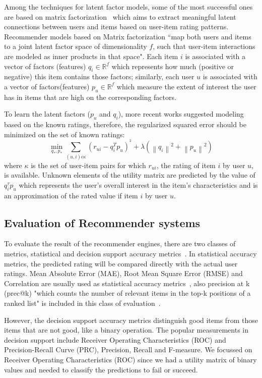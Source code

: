Among the techniques for latent factor models, some of the most successful ones are based on matrix factorization~\cite{koren2009matrix} which aims to extract meaningful latent connections between users and items based on user-item rating patterns. Recommender models based on Matrix factorization ``map both users and items to a joint latent factor space of dimensionality $f$, such that user-item interactions are modeled as inner products in that space". Each item $i$ is associated with a vector of factors (features) 
$q_{i}\in \mathbb{R}^{f}$
which represents how much (positive or negative) this item contains those factors; similarly, each user $u$ is associated with a vector of factors(features) 
$p_{u}\in \mathbb{R}^{f}$
which measure the extent of interest the user has in items that are high on the corresponding factors. 


To learn the latent factors ($p_{u}$ and $q_{i}$), more recent works suggested modeling based on the known ratings, therefore, the regularized squared error should be minimized on the set of 
known ratings:
\begin{equation} \tag{1}
   \min_{q_{*},p_{*}} \sum_{(u,i) \epsilon \kappa }  (r_{ui}-q_{i}^{T}p_{u})^{^2}+\lambda \left ( \left \| q_{i}\right \|^2+\left \| p_{u}\right \|^2 \right )            \label{equation}
\end{equation}
where $\kappa$ is the set of user-item pairs for which $r_{ui}$, the rating of item $i$ by user $u$, is available. Unknown elements of the utility matrix are predicted by the value of $q_{i}^{\tau }p_{u}$ which represents the user’s overall interest in the item’s characteristics and is an approximation of the rated value if item $i$ by user $u$. 


\subsection{Evaluation of Recommender systems}

To evaluate the result of the recommender engines, there are two classes of metrics, statistical and decision support accuracy metrics~\cite{sarwar2001item}.  In statistical accuracy metrics, the predicted rating will be compared directly with the actual user ratings. Mean Absolute Error (MAE), Root Mean Square Error (RMSE) and Correlation are usually used as statistical accuracy metrics~\cite{isinkaye2015recommendation}, also precision at k (prec@k) "which counts the number of relevant items in the top-k positions of a
ranked list" is included in this class of evaluation~\cite{liu2015transductive,kar2015surrogate}.

However, the decision support accuracy metrics distinguish good items from those items that are not good, like a binary operation. The popular measurements in decision support include Receiver Operating Characteristics (ROC) and Precision-Recall Curve (PRC), Precision, Recall and F-measure. We focussed on Receiver Operating Characteristics (ROC) since we had a utility matrix of binary values and needed to classify the predictions to fail or succeed.

